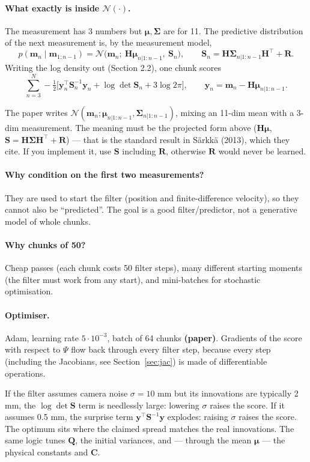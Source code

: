 \documentclass[11pt,a4paper]{article}
\newcommand{\mm}{\mathbf{m}}
\newcommand{\mmu}{\boldsymbol{\mu}}
\newcommand{\SSigma}{\boldsymbol{\Sigma}}
\begin{document}
\paragraph{What exactly is inside $\mathcal N(\cdot)$.} The measurement has 3 numbers but $\mmu,\SSigma$ are for 11. The predictive distribution of the next measurement is, by the measurement model,
\[
p(\mm_n\mid\mm_{1:n-1})=\mathcal N\big(\mm_n;\ \mathbf H\mmu_{n|1:n-1},\ \mathbf S_n\big),\qquad\mathbf S_n=\mathbf H\SSigma_{n|1:n-1}\mathbf H^\top+\mathbf R .
\]
Writing the log density out (Section 2.2), one chunk scores
\[
\sum_{n=3}^N-\tfrac12\Big[\mathbf y_n^\top\mathbf S_n^{-1}\mathbf y_n+\log\det\mathbf S_n+3\log2\pi\Big],\qquad\mathbf y_n=\mm_n-\mathbf H\mmu_{n|1:n-1}.
\]
\begin{warn}
The paper writes $\mathcal N(\mm_n;\mmu_{n|1:n-1},\SSigma_{n|1:n-1})$, mixing an 11-dim mean with a 3-dim measurement. The meaning must be the projected form above ($\mathbf H\mmu$, $\mathbf S=\mathbf H\SSigma\mathbf H^\top+\mathbf R$) --- that is the standard result in Särkkä (2013), which they cite.
If you implement it, use $\mathbf S$ including $\mathbf R$, otherwise $\mathbf R$ would never be learned.
\end{warn}
\paragraph{Why condition on the first two measurements?} They are used to start the filter (position and finite-difference velocity), so they cannot also be ``predicted''. The goal is a good filter/predictor, not a generative model of whole chunks.
\paragraph{Why chunks of 50?} Cheap passes (each chunk costs 50 filter steps), many different starting moments (the filter must work from any start), and mini-batches for stochastic optimisation.
\paragraph{Optimiser.} Adam, learning rate $5\cdot10^{-3}$, batch of 64 chunks \textbf{(paper)}. Gradients of the score with respect to $\Psi$ flow back through every filter step, because every step (including the Jacobians, see Section~\ref{sec:jac}) is made of differentiable operations.

\begin{toy}
If the filter assumes camera noise $\sigma=10$ mm but its innovations are typically 2 mm, the $\log\det\mathbf S$ term is needlessly large: lowering $\sigma$ raises the score.
If it assumes 0.5 mm, the surprise term $\mathbf y^\top\mathbf S^{-1}\mathbf y$ explodes: raising $\sigma$ raises the score. The optimum sits where the claimed spread matches the real innovations.
The same logic tunes $\mathbf Q$, the initial variances, and --- through the mean $\mmu$ --- the physical constants and $\mathbf C$.
\end{toy}
\end{document}

